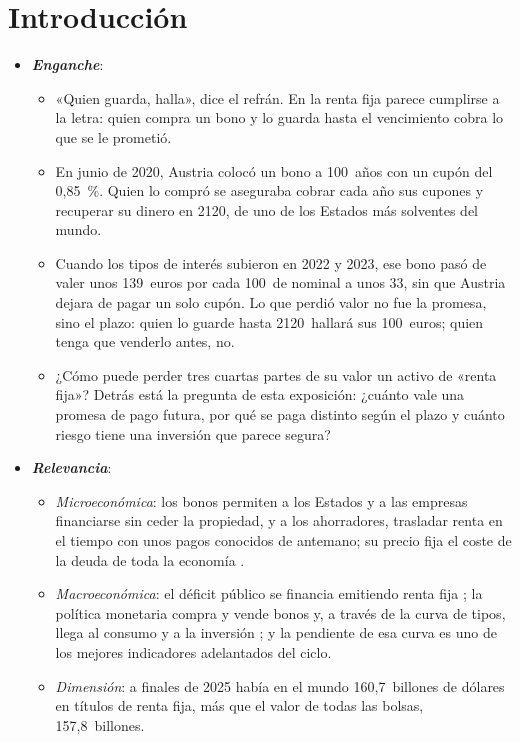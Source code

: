 \documentclass[11pt]{article}
\begin{document}
\tceetitulo

\section*{Introducción}

\begin{itemize}
\item \textbf{\emph{Enganche}}:
  \begin{itemize}
  \item «Quien guarda, halla», dice el refrán. En la renta fija parece cumplirse a la letra: quien compra un bono y lo guarda hasta el vencimiento cobra lo que se le prometió.
  \item En junio de 2020, Austria colocó un bono a 100~años con un cupón del 0,85~\%. Quien lo compró se aseguraba cobrar cada año sus cupones y recuperar su dinero en 2120, de uno de los Estados más solventes del mundo\nocite{Saxo2024Century}.
  \item Cuando los tipos de interés subieron en 2022 y 2023, ese bono pasó de valer unos 139~euros por cada 100~de nominal a unos 33\nocite{Saxo2024Century}, sin que Austria dejara de pagar un solo cupón. Lo que perdió valor no fue la promesa, sino el plazo: quien lo guarde hasta 2120~hallará sus 100~euros; quien tenga que venderlo antes, no.
  \item ¿Cómo puede perder tres cuartas partes de su valor un activo de «renta fija»? Detrás está la pregunta de esta exposición: ¿cuánto vale una promesa de pago futura, por qué se paga distinto según el plazo y cuánto riesgo tiene una inversión que parece segura?
  \end{itemize}

\item \textbf{\emph{Relevancia}}:
  \begin{itemize}
  \item \emph{Microeconómica}: los bonos permiten a los Estados y a las empresas financiarse sin ceder la propiedad, y a los ahorradores, trasladar renta en el tiempo con unos pagos conocidos de antemano; su precio fija el coste de la deuda de toda la economía .
  \item \emph{Macroeconómica}: el déficit público se financia emitiendo renta fija ; la política monetaria compra y vende bonos y, a través de la curva de tipos, llega al consumo y a la inversión ; y la pendiente de esa curva es uno de los mejores indicadores adelantados del ciclo.
  \item \emph{Dimensión}: a finales de 2025 había en el mundo 160,7~billones de dólares en títulos de renta fija, más que el valor de todas las bolsas, 157,8~billones\nocite{SIFMA2026FactBook}.
  \end{itemize}


\end{itemize}
\end{document}
